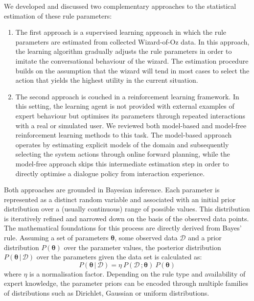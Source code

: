 We developed and discussed two complementary approaches to the statistical estimation of these rule parameters:
\begin{enumerate}
\item The first approach is a supervised learning approach in which the rule parameters are estimated from collected Wizard-of-Oz data.  In this approach, the learning algorithm gradually adjusts the rule parameters in order to imitate the conversational behaviour of the wizard. The estimation procedure builds on the assumption that the wizard will tend in most cases to select the action that yields the highest utility in the current situation. 
\item The second approach is couched in a reinforcement learning framework.  In this setting, the learning agent is not provided with external examples of expert behaviour but optimises its parameters through repeated interactions with a real or simulated user. We reviewed both model-based and model-free reinforcement learning methods to this task.  The model-based approach operates by estimating explicit models of the domain and subsequently selecting the system actions through online forward planning, while the model-free approach skips this intermediate estimation step in order to directly optimise a dialogue policy from interaction experience. 
\end{enumerate}

Both approaches are grounded in Bayesian inference.  Each parameter is represented as a distinct random variable and associated with an initial prior distribution over a (usually continuous) range of possible values. This distribution is iteratively refined and narrowed down on the basis of the observed data points. The mathematical foundations for this process are directly derived from Bayes' rule. Assuming a set of parameters $\boldsymbol\theta$, some observed data $\mathcal{D}$ and a prior distribution $P(\boldsymbol\theta)$ over the parameter values, the posterior distribution $P(\boldsymbol\theta \, | \, \mathcal{D})$ over the parameters given the data set is calculated as:
\begin{equation}
P(\boldsymbol\theta \, | \, \mathcal{D}) = \eta \ P(\mathcal{D} \,; \boldsymbol\theta) \ P(\boldsymbol\theta)
\end{equation}
where $\eta$ is a normalisation factor. Depending on the rule type and availability of expert knowledge, the parameter priors can be encoded through multiple families of distributions such as Dirichlet, Gaussian or uniform distributions. 

